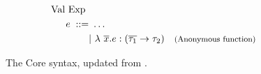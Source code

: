 \begin{figure}[htb]
\begin{align*}
\begin{aligned}
\text{Val Exp } \\
e \; ::= &\ \ldots \\
&|\ \lambda\ \overline{x}.e:(\overline{\tau_{1}}\rightarrow\tau_{2}) & \footnotesize\text{(Anonymous function)}
\end{aligned}
\end{align*}
\caption[Updated Core Syntax]{The Core syntax, updated from {\protect{}}.\label{fig:UpdatedCoreSyntax}}
\end{figure}